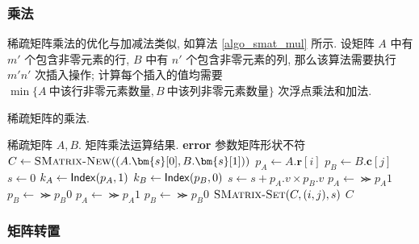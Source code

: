 \subsubsection{乘法}

稀疏矩阵乘法的优化与加减法类似, 如算法 \ref{algo_smat_mul} 所示. 设矩阵 $A$ 中有 $m'$ 个包含非零元素的行, $B$ 中有 $n'$ 个包含非零元素的列, 那么该算法需要执行 $m' n'$ 次插入操作; 计算每个插入的值均需要 $\min\{A\ \text{中该行非零元素数量}, B\ \text{中该列非零元素数量}\}$ 次浮点乘法和加法.
\begin{breakablealgorithm}
\caption{稀疏矩阵的乘法.}
\label{algo_smat_mul}
\begin{algorithmic}[1]
\Require 稀疏矩阵 $A, B.$
\Ensure 矩阵乘法运算结果.
        \State \textbf{error} 参数矩阵形状不符
    \EndIf
    \State $C \gets \textsc{SMatrix-New}((A.\bm{s}[0], B.\bm{s}[1]))$
            \State $p_A \gets A.\bm{r}[i]$
            \State $p_B \gets B.\bm{c}[j]$
            \State $s \gets 0$
                    \State $k_A \gets \mathsf{Index}(p_A, 1)$
                    \State $k_B \gets \mathsf{Index}(p_B, 0)$
                        \State $s \gets s + p_A.v \times p_B.v$
                    \EndIf
                        \State $p_A \gets \Succ{p_A}{1}$
                    \EndIf
                        \State $p_B \gets \Succ{p_B}{0}$
                    \EndIf
                \Else
                        \State $p_A \gets \Succ{p_A}{1}$
                    \EndIf
                        \State $p_B \gets \Succ{p_B}{0}$
                    \EndIf
                \EndIf
            \EndWhile
            \State $\textsc{SMatrix-Set}(C, (i, j), s)$
        \EndFor
    \EndFor
    \State \Return $C$
\EndFunction
\end{algorithmic}
\end{breakablealgorithm}

\subsubsection{矩阵转置}

